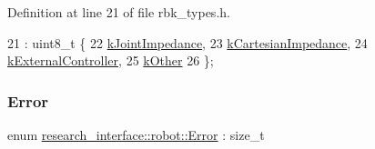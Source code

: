 Definition at line 21 of file rbk\+\_\+types.\+h.


\begin{DoxyCode}
21                           : uint8\_t \{
22   \hyperlink{namespaceresearch__interface_1_1robot_a54ee0c8bfefd2ee8a46837ca6d2b1213aa7cd8fc7552b5b9c50684e57f032d724}{kJointImpedance},
23   \hyperlink{namespaceresearch__interface_1_1robot_a54ee0c8bfefd2ee8a46837ca6d2b1213ac2c3f2cf686f3debef77b3049958b488}{kCartesianImpedance},
24   \hyperlink{namespaceresearch__interface_1_1robot_a54ee0c8bfefd2ee8a46837ca6d2b1213aae18ec698c6d2260b411166de51e86fe}{kExternalController},
25   \hyperlink{namespacetesting_1_1internal_aa8747bda20137c9aa7f846dee830e686ad47f29150ab7a9ec8ce2491f44537347}{kOther}
26 \};
\end{DoxyCode}
\mbox{\label{namespaceresearch__interface_1_1robot_a32c6a50656f8b9130114ad84bdde7589}} 
\subsubsection{\texorpdfstring{Error}{Error}}
{\footnotesize\ttfamily enum \hyperlink{namespaceresearch__interface_1_1robot_a32c6a50656f8b9130114ad84bdde7589}{research\+\_\+interface\+::robot\+::\+Error} \+: size\+\_\+t\hspace{0.3cm}{\ttfamily [strong]}}

